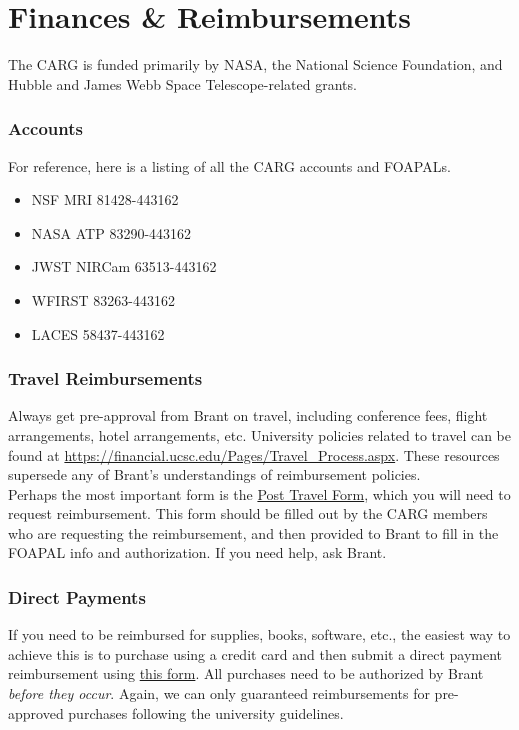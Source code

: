 \section{Finances \& Reimbursements}
\label{sec:finances}

The CARG is funded primarily by
NASA,
the National Science Foundation,
and Hubble and James Webb Space
Telescope-related grants. 

\subsubsection{Accounts}
For reference, here is a listing of all the CARG accounts and FOAPALs.
\begin{itemize}
\item NSF MRI 81428-443162
\item NASA ATP 83290-443162
\item JWST NIRCam 63513-443162
\item WFIRST 83263-443162
\item LACES 58437-443162
\end{itemize}

\subsubsection{Travel Reimbursements}

Always get pre-approval from 
Brant on travel,
including conference fees,
flight arrangements, 
hotel arrangements, etc. 
University policies related to
travel can be found at \href{https://financial.ucsc.edu/Pages/Travel_Process.aspx}{https://financial.ucsc.edu/Pages/Travel\_Process.aspx}. These resources
supersede any of Brant's 
understandings of reimbursement
policies.\\

\noindent
Perhaps the most important form is the 
\href{https://financial.ucsc.edu/Financial_Affairs_Forms/Post_Travel_Expense.pdf}{Post Travel Form}, which
you will need to request reimbursement.
This form should be filled out by
the CARG members who are 
requesting the reimbursement, and
then provided to Brant to fill in
the FOAPAL info and authorization.
If you need help, ask Brant.

\subsubsection{Direct Payments}
\label{sec:direct_payments}

If you need to be reimbursed for supplies, books, software, etc., the easiest way to achieve this is to purchase using a credit card and then submit a direct payment reimbursement using \href{https://financial.ucsc.edu/Pages/WF_Direct_Payment.aspx}{this form}. All purchases need to be authorized by Brant \emph{before they occur}. Again, we can only guaranteed reimbursements for pre-approved purchases following the university guidelines.


